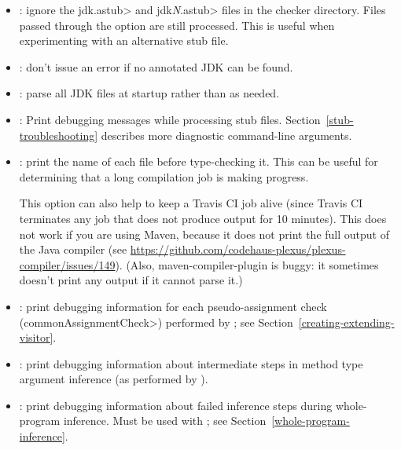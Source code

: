 
\begin{itemize}

\item {}:
  ignore the \<jdk.astub> and \<jdk\emph{N}.astub> files in the checker directory. Files passed
  through the  option are still processed. This is useful
  when experimenting with an alternative stub file.

\item {}:
  don't issue an error if no annotated JDK can be found.

\item {}:
  parse all JDK files at startup rather than as needed.

\item {}:
  Print debugging messages while processing stub files.
  Section~\ref{stub-troubleshooting} describes more diagnostic command-line
  arguments.

\end{itemize}


\begin{itemize}

\item {}: print the name of each file before type-checking it.
This can be useful for determining that a long compilation job is making
progress.

This option can also help to keep a Travis CI job alive (since Travis CI
terminates any job that does not produce output for 10 minutes).
This does not work if you are using Maven, because it does not print
the full output of the Java compiler (see \url{https://github.com/codehaus-plexus/plexus-compiler/issues/149}).
(Also, maven-compiler-plugin is buggy: it sometimes
doesn't print any output if it cannot parse it.)

\item {}: print debugging information for each
pseudo-assignment check (\<commonAssignmentCheck>) performed by
; see
Section~\ref{creating-extending-visitor}.

\item {}: print debugging information
about intermediate steps in method type argument inference
(as performed by ).

\item {}: print debugging information
about failed inference steps during whole-program inference. Must
be used with ; see Section~\ref{whole-program-inference}.

\end{itemize}

